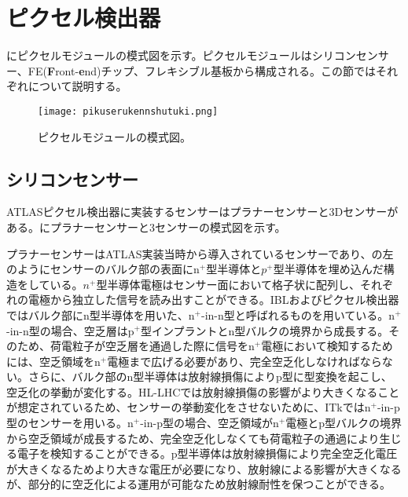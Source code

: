 \section{ピクセル検出器}
\label{sec:pixelkenshutuki}

にピクセルモジュールの模式図を示す。ピクセルモジュールはシリコンセンサー、FE(\textbf{F}ront-\textbf{e}nd)チップ、フレキシブル基板から構成される。この節ではそれぞれについて説明する。

\begin{figure}[tbp]
  \centering
  \texttt{[image: pikuserukennshutuki.png]}
  \caption[ピクセルモジュールの模式図]{ピクセルモジュールの模式図。}
  \label{fig:pikuserukennshutuki}
\end{figure}

\subsection{シリコンセンサー}
\label{sec:silicon}
ATLASピクセル検出器に実装するセンサーはプラナーセンサーと3Dセンサーがある。にプラナーセンサーと3センサーの模式図を示す。

プラナーセンサーはATLAS実装当時から導入されているセンサーであり、の左のようにセンサーのバルク部の表面にn$^+$型半導体と$p^+$型半導体を埋め込んだ構造をしている。$n^+$型半導体電極はセンサー面において格子状に配列し、それぞれの電極から独立した信号を読み出すことができる。IBLおよびピクセル検出器ではバルク部にn型半導体を用いた、n$^{+}$-in-n型と呼ばれるものを用いている。n$^{+}$-in-n型の場合、空乏層はp$^{+}$型インプラントとn型バルクの境界から成長する。そのため、荷電粒子が空乏層を通過した際に信号をn$^{+}$電極において検知するためには、空乏領域をn$^{+}$電極まで広げる必要があり、完全空乏化しなければならない。さらに、バルク部のn型半導体は放射線損傷によりp型に型変換を起こし、空乏化の挙動が変化する。HL-LHCでは放射線損傷の影響がより大きくなることが想定されているため、センサーの挙動変化をさせないために、ITkではn$^{+}$-in-p型のセンサーを用いる。n$^{+}$-in-p型の場合、空乏領域がn$^{+}$電極とp型バルクの境界から空乏領域が成長するため、完全空乏化しなくても荷電粒子の通過により生じる電子を検知することができる。p型半導体は放射線損傷により完全空乏化電圧が大きくなるためより大きな電圧が必要になり、放射線による影響が大きくなるが、部分的に空乏化による運用が可能なため放射線耐性を保つことができる。


